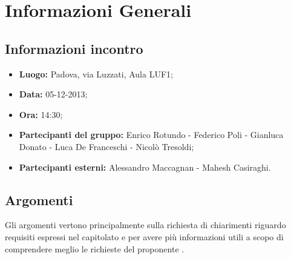 \section{Informazioni Generali}
	\subsection{Informazioni incontro}
	\begin{itemize}
		\item {\bfseries Luogo:} Padova, via Luzzati, Aula LUF1;
		\item {\bfseries Data:} 05-12-2013;
		\item {\bfseries Ora:} 14:30;
		\item {\bfseries Partecipanti del gruppo:} Enrico Rotundo - Federico Poli - Gianluca Donato - Luca De Franceschi - Nicolò Tresoldi;
		\item {\bfseries Partecipanti esterni:} Alessandro Maccagnan - Mahesh Casiraghi.
	\end{itemize}
	
	\subsection{Argomenti}
		Gli argomenti vertono principalmente sulla richiesta di chiarimenti riguardo requisiti espressi nel capitolato e per avere più informazioni utili a scopo di comprendere meglio le richieste del proponente \Proponente{}.